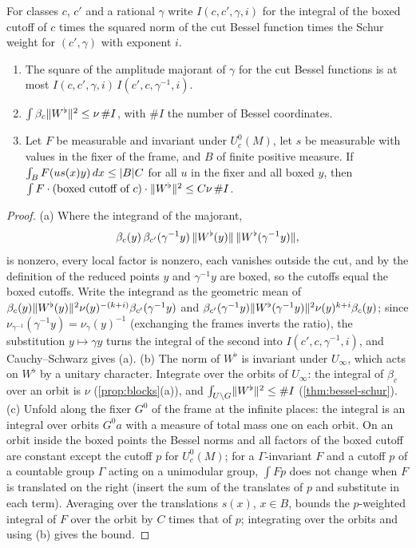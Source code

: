 \begin{lemma}\label{lem:schur-cs}
For classes $c$, $c'$ and a rational $\gamma$ write $I(c,c',\gamma,i)$ for the integral of the boxed cutoff of $c$ times the squared norm of the cut Bessel function times the Schur weight for $(c',\gamma)$ with
exponent $i$.
\begin{enumerate}[label=\textup{(\alph*)}]
\item The square of the amplitude majorant of $\gamma$ for the cut Bessel functions is at most $I(c,c',\gamma,i)\,I(c',c,\gamma^{-1},i)$.
\item $\int\beta_c\lVert W^\flat\rVert^2\le\nu\,\#I$, with $\#I$ the number of Bessel coordinates.
\item Let $F$ be measurable and invariant under $U^0_c(M)$, let $s$ be measurable with values in the fixer of the frame, and $B$ of finite positive measure. If $\int_BF(us(x)y)\,dx\le\lvert B\rvert C$ for all $u$ in the fixer
and all boxed $y$, then $\int F\cdot\text{(boxed cutoff of $c$)}\cdot\lVert W^\flat\rVert^2\le C\nu\,\#I$.
\end{enumerate}
\end{lemma}

\begin{proof}
(a) Where the integrand of the majorant,
\[
  \beta_c(y)\,\beta_{c'}(\gamma^{-1}y)\,\lVert W^\flat(y)\rVert\,\lVert W^\flat(\gamma^{-1}y)\rVert,
\]
is nonzero, every local factor is nonzero, each vanishes outside the cut, and by the definition of
the reduced points $y$ and $\gamma^{-1}y$ are boxed, so the cutoffs equal the boxed cutoffs. Write the integrand as the geometric mean of $\beta_c(y)\lVert W^\flat(y)\rVert^2\nu(y)^{-(k+i)}\beta_{c'}(\gamma^{-1}y)$ and
$\beta_{c'}(\gamma^{-1}y)\lVert W^\flat(\gamma^{-1}y)\rVert^2\nu(y)^{k+i}\beta_c(y)$; since $\nu_{\gamma^{-1}}(\gamma^{-1}y)=\nu_\gamma(y)^{-1}$ (exchanging the frames inverts the ratio), the substitution $y\mapsto\gamma y$ turns the integral of the
second into $I(c',c,\gamma^{-1},i)$, and Cauchy--Schwarz gives (a).
(b) The norm of $W^\flat$ is invariant under $U_\infty$, which acts on $W^\flat$ by a unitary character. Integrate over the orbits of $U_\infty$: the integral of $\beta_c$ over an orbit is $\nu$
(\cref{prop:blocks}(a)), and $\int_{U\backslash G}\lVert W^\flat\rVert^2\le\#I$ (\cref{thm:bessel-schur}).
(c) Unfold along the fixer $G^0$ of the frame at the infinite places: the integral is an integral over orbits $G^0a$ with a measure of total mass one on each orbit. On an orbit inside the boxed points the
Bessel norms and all factors of the boxed cutoff are constant except the cutoff $p$ for $U^0_c(M)$; for a $\Gamma$-invariant $F$ and a cutoff $p$ of a countable group $\Gamma$ acting on a unimodular group,
$\int Fp$ does not change when $F$ is translated on the right (insert the sum of the translates of $p$ and substitute in each term). Averaging over the translations $s(x)$, $x\in B$, bounds the $p$-weighted
integral of $F$ over the orbit by $C$ times that of $p$; integrating over the orbits and using (b) gives the bound.
\end{proof}

